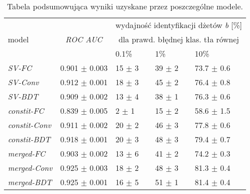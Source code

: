 \begin{table}[ht]
\centering
\begin{tabular}{lcp{1.8cm}p{1.8cm}p{1.8cm}}
\toprule
                      &                   & \multicolumn{3}{c}{wydajność identyfikacji dżetów \textit{b} [\%]}    \\
model                 & \textit{ROC AUC}  & \multicolumn{3}{c}{dla prawd. błędnej klas. tła równej} \\
                      & \hspace{9em}                  & \hspace{0.5em} 0.1\%             & \hspace{0.5em} 1\%              & \hspace{0.5em} 10\%             \\
\midrule                      
\textit{SV-FC}        & 0.901 $\pm$ 0.003 & 15 $\pm$ 3        & 39 $\pm$ 2       & 73.7 $\pm$ 0.6       \\
\textit{SV-Conv}      & 0.912 $\pm$ 0.001 & 18 $\pm$ 3        & 45 $\pm$ 2       & 76.4 $\pm$ 0.8       \\
\vspace{5pt}
\textit{SV-BDT}       & 0.909 $\pm$ 0.002 & 13 $\pm$ 4        & 38 $\pm$ 1       & 76.3 $\pm$ 0.6       \\
\textit{constit-FC}   & 0.839 $\pm$ 0.005 & \hspace{0.5em}2 $\pm$ 1         & 15 $\pm$ 2       & 58.6 $\pm$ 1.5       \\
\textit{constit-Conv} & 0.911 $\pm$ 0.002 & 20 $\pm$ 2        & 46 $\pm$ 3       & 77.8 $\pm$ 0.6       \\
\vspace{5pt}
\textit{constit-BDT}  & 0.918 $\pm$ 0.001 & 20 $\pm$ 3        & 48 $\pm$ 3       & 79.4 $\pm$ 0.7       \\
\textit{merged-FC}    & 0.903 $\pm$ 0.002 & 13 $\pm$ 6        & 41 $\pm$ 2       & 74.2 $\pm$ 0.3       \\
\textit{merged-Conv}  & 0.925 $\pm$ 0.003 & 18 $\pm$ 2        & 48 $\pm$ 3       & 81.3 $\pm$ 0.4       \\
\textit{merged-BDT}   & 0.925 $\pm$ 0.001 & 16 $\pm$ 5        & 51 $\pm$ 1       & 81.4 $\pm$ 0.4		\\
\bottomrule  
\end{tabular}
\caption{Tabela podsumowująca wyniki uzyskane przez poszczególne modele.}
\label{tab:wyniki-modeli}
\end{table}


\newpage
\FloatBarrier
